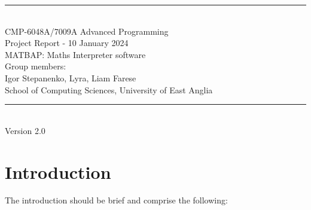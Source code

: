 \documentclass[a4paper, oneside, 11pt]{report}
\begin{document}
\begin{titlepage}
\begin{center}
\rule{12cm}{1mm} \\
\vspace{1cm}
{\large  CMP-6048A/7009A Advanced Programming} %
\vspace{7.5cm}
\\{\Large Project Report - 10 January 2024}
\vspace{1.5cm}
\\{\LARGE MATBAP: Maths Interpreter software} %
\vspace{1.0cm}
\\{\Large Group members: \\ Igor Stepanenko, Lyra, Liam Farese\ }
\vspace{10.0cm}
\\{\large School of Computing Sciences, University of East Anglia}
\\ \rule{12cm}{0.5mm}
\\ \hspace{8.5cm} {\large Version 2.0}
\end{center}
\end{titlepage}


\setcounter{page}{1}


\begin{abstract}
Please replace this section with your own abstract. An abstract is a brief summary (maximum 250 words) of your entire project. It should cover your objectives, your methodologies used, a brief developmental history, your final results, in particular covering the optional tasks, and a discussion and conclusion. You do not cover the literature or background in an abstract nor should you use abbreviations or acronyms. The remainder of this report template has clear chapter titles and we suggest to stick to these although you can organise your material inside each chapter to your own preferences. A guideline in size is approximately 3,500 words (not including abstract, captions and references) but no real limit on figures, tables, diagrams, pseudo-code etc.
\end{abstract}

\chapter{Introduction}
\label{chap:intro}

The introduction should be brief and comprise the following:
\end{document}
